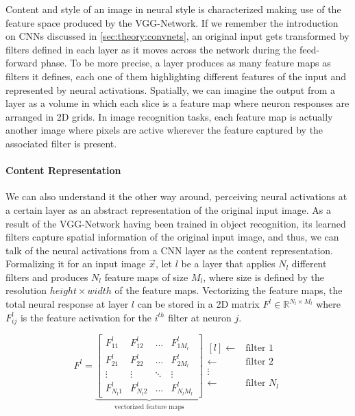Content and style of an image in neural style is characterized making use of the feature space produced by the VGG-Network.
If we remember the introduction on CNNs discussed in \autoref{sec:theory:convnets}, an original input gets transformed by filters defined in each layer as it moves across the network during the feed-forward phase.
To be more precise, a layer produces as many feature maps as filters it defines, each one of them highlighting different features of the input and represented by neural activations.
Spatially, we can imagine the output from a layer as a volume in which each slice is a feature map where neuron responses are arranged in 2D grids.
In image recognition tasks, each feature map is actually another image where pixels are active wherever the feature captured by the associated filter is present.

\paragraph{Content Representation}
We can also understand it the other way around, perceiving neural activations at a certain layer as an abstract representation of the original input image.
As a result of the VGG-Network having been trained in object recognition, its learned filters capture spatial information of the original input image, and thus, we can talk of the neural activations from a CNN layer as the content representation.
Formalizing it for an input image $\vec{x}$, let $l$ be a layer that applies $N_l$ different filters and produces $N_l$ feature maps of size $M_l$, where size is defined by the resolution ${height}\times{width}$ of the feature maps.
Vectorizing the feature maps, the total neural response at layer $l$ can be stored in a 2D matrix $F^l \in \mathbb{R}^{{N_l}\times{M_l}}$ where $F^l_{ij}$ is the feature activation for the $i^{th}$ filter at neuron $j$.

\begin{equation}
  F^l =
  \underbrace{
    \begin{bmatrix}
      F^l_{11}   & F^l_{12}   & \dots  & F^l_{1M_l} \\
      F^l_{21}   & F^l_{22}   & \dots  & F^l_{2M_l} \\
      \vdots     & \vdots     & \ddots & \vdots   \\
      F^l_{N_l1} & F^l_{N_l2} & \dots  & F^l_{N_lM_l}
    \end{bmatrix}
  }_{\text{vectorized feature maps}}
  \begin{matrix*}[l]
    \leftarrow & \text{filter } 1 \\
    \leftarrow & \text{filter } 2 \\
    \vdots                     \\
    \leftarrow & \text{filter } N_l
  \end{matrix*}
\end{equation}

